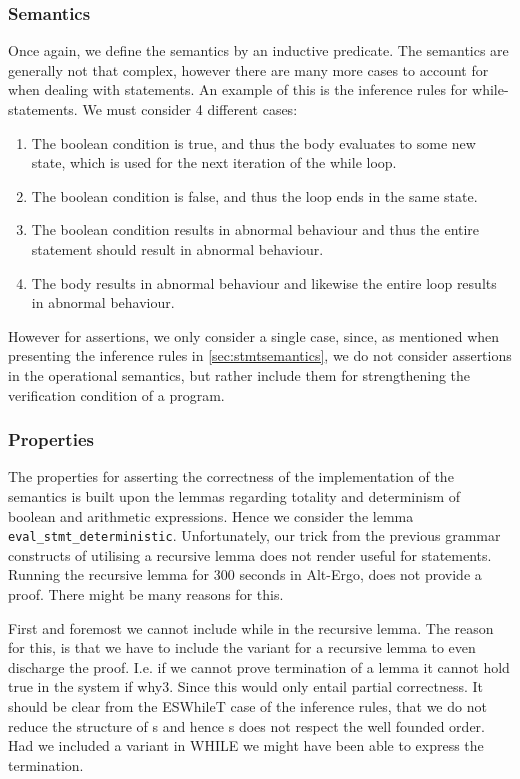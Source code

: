 \subsubsection{Semantics}
Once again, we define the semantics by an inductive predicate. The semantics are generally not that complex,
however there are many more cases to account for when dealing with statements.
An example of this is the inference rules for while-statements.
We must consider 4 different cases:

\begin{enumerate}
  \item The boolean condition is true, and thus the body evaluates to some new state, which is used for the next iteration of the while loop.
  \item The boolean condition is false, and thus the loop ends in the same state.
  \item The boolean condition results in abnormal behaviour and thus the entire statement should result in abnormal behaviour.
  \item The body results in abnormal behaviour and likewise the entire loop results in abnormal behaviour.
\end{enumerate}

However for assertions, we only consider a single case, since, as mentioned when presenting the inference rules in \ref{sec:stmtsemantics},
we do not consider assertions in the operational semantics, but rather include them for strengthening the
verification condition of a program.

\subsubsection{Properties}
The properties for asserting the correctness of the implementation of the semantics is built
upon the lemmas regarding totality and determinism of boolean and arithmetic expressions.
Hence we consider the lemma
\texttt{eval_stmt_deterministic}. Unfortunately, our trick from the previous grammar constructs of utilising a recursive lemma does not render useful for statements. Running the recursive lemma for 300 seconds in Alt-Ergo, does not provide a proof.
There might be many reasons for this.

First and foremost we cannot include while in the recursive lemma. The reason for this, is that we have to
include the variant for a recursive lemma to even discharge the proof. I.e. if we cannot prove termination of a lemma it cannot hold true in the system if why3. Since this would only entail partial correctness.
It should be clear from the ESWhileT case of the inference rules, that we do not reduce the structure of s and hence s does not respect the well founded order.
Had we included a variant in WHILE we might have been able to express the termination.

